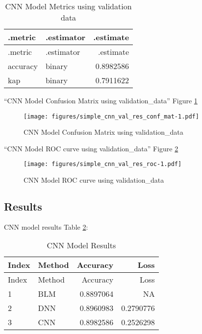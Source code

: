 \documentclass[
]{article}
\begin{document}
\begin{longtable}[]{@{}llr@{}}
\caption{CNN Model Metrics using validation
data\label{tbl:simple_cnn_val_res_metrics}}\tabularnewline
\toprule
.metric & .estimator & .estimate \\
\midrule
\endfirsthead
\toprule
.metric & .estimator & .estimate \\
\midrule
\endhead
accuracy & binary & 0.8982586 \\
kap & binary & 0.7911622 \\
\bottomrule
\end{longtable}

``CNN Model Confusion Matrix using validation\_data'' Figure
\ref{fig:model_15}

\begin{figure}
\centering
\texttt{[image: figures/simple\_cnn\_val\_res\_conf\_mat-1.pdf]}
\caption{CNN Model Confusion Matrix using
validation\_data\label{fig:model_15}}
\end{figure}

``CNN Model ROC curve using validation\_data'' Figure \ref{fig:model_16}

\begin{figure}
\centering
\texttt{[image: figures/simple\_cnn\_val\_res\_roc-1.pdf]}
\caption{CNN Model ROC curve using validation\_data\label{fig:model_16}}
\end{figure}

\newpage

\hypertarget{results-2}{%
\subsection{Results}\label{results-2}}

CNN model results Table \ref{tbl:cnn_results_table}:

\begin{longtable}[]{@{}llrr@{}}
\caption{CNN Model Results\label{tbl:cnn_results_table}}\tabularnewline
\toprule
Index & Method & Accuracy & Loss \\
\midrule
\endfirsthead
\toprule
Index & Method & Accuracy & Loss \\
\midrule
\endhead
1 & BLM & 0.8897064 & NA \\
2 & DNN & 0.8960983 & 0.2790776 \\
3 & CNN & 0.8982586 & 0.2526298 \\
\bottomrule
\end{longtable}

\newpage
\end{document}
